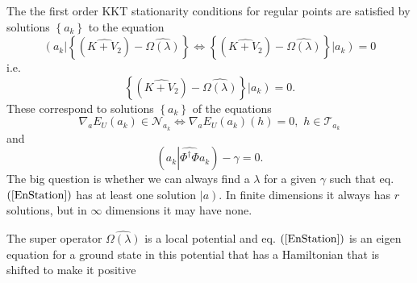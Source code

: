 \documentclass[aps,preprint]{revtex4}%
\begin{document}
The the first order KKT stationarity conditions for regular points are
satisfied by solutions $\left\{  a_{k}\right\}  $ to the equation
\begin{equation}
\left(  \overset{}{a_{k}}\right\vert \left\{  \left(  \widehat{K+V_{2}%
}\right)  -\widehat{\Omega\left(  \lambda\right)  }\right\}  \Leftrightarrow
\left\{  \left(  \widehat{K+V_{2}}\right)  -\widehat{\Omega\left(
\lambda\right)  }\right\}  \left\vert \overset{}{a_{k}}\right)  =0
\label{EnStation}%
\end{equation}
i.e.
\begin{equation}
\left\{  \left(  \widehat{K+V_{2}}\right)  -\widehat{\Omega\left(
\lambda\right)  }\right\}  \left\vert \overset{}{a_{k}}\right)  =0.
\end{equation}
These correspond to solutions $\left\{  a_{k}\right\}  $ of the equations
\begin{equation}
\nabla_{a}E_{U}\left(  a_{k}\right)  \in\mathcal{N}_{a_{k}}\Leftrightarrow
\nabla_{a}E_{U}\left(  a_{k}\right)  \left(  h\right)  =0,\,\,h\in
\mathcal{T}_{a_{k}}%
\end{equation}
and
\begin{equation}
\left(  a_{k}\left\vert \widehat{\Phi^{\dagger}\Phi}\right.  a_{k}\right)
-\gamma=0. \label{surface}%
\end{equation}
The big question is whether we can always find a $\lambda$ for a given
$\gamma$ such that eq. $\left(  \ref{EnStation}\right)  $ has at least one
solution $\left\vert \overset{}{a}\right)  .$ In finite dimensions it always
has $r$ solutions, but in $\infty$ dimensions it may have none.

The super operator $\widehat{\Omega\left(  \lambda\right)  }$ is a local
potential and eq. $\left(  \ref{EnStation}\right)  $ is an eigen equation for
a ground state in this potential that has a Hamiltonian that is shifted to
make it positive
\end{document}
